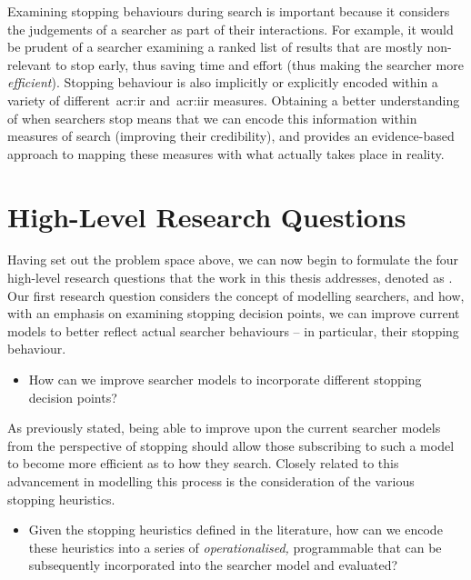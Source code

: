 
Examining stopping behaviours during search is important because it considers the judgements of a searcher as part of their interactions. For example, it would be prudent of a searcher examining a ranked list of results that are mostly non-relevant to stop early, thus saving time and effort (thus making the searcher more \emph{efficient}). Stopping behaviour is also implicitly or explicitly encoded within a variety of different~\gls{acr:ir} and~\gls{acr:iir} measures. Obtaining a better understanding of when searchers stop means that we can encode this information within measures of search (improving their credibility), and provides an evidence-based approach to mapping these measures with what actually takes place in reality.

\section{High-Level Research Questions}\label{sec:intro:rqs}
Having set out the problem space above, we can now begin to formulate the four high-level research questions that the work in this thesis addresses, denoted as . Our first research question considers the concept of modelling searchers, and how, with an emphasis on examining stopping decision points, we can improve current models to better reflect actual searcher behaviours -- in particular, their stopping behaviour.

\begin{itemize}
    \item{ How can we improve searcher models to incorporate different stopping decision points?}
\end{itemize}

As previously stated, being able to improve upon the current searcher models from the perspective of stopping should allow those subscribing to such a model to become more efficient as to how they search. Closely related to this advancement in modelling this process is the consideration of the various stopping heuristics.

\begin{itemize}
    \item{ Given the stopping heuristics defined in the literature, how can we encode these heuristics into a series of \emph{operationalised,} programmable  that can be subsequently incorporated into the searcher model and evaluated?}
\end{itemize}

